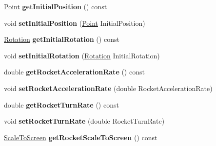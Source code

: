 \begin{DoxyCompactItemize}
\item 
\hyperlink{classPoint}{Point} {\bfseries get\+Initial\+Position} () const \hypertarget{classGameConfiguration_ace6795655ac1a88974356c99810f7e4d}{}\label{classGameConfiguration_ace6795655ac1a88974356c99810f7e4d}

\item 
void {\bfseries set\+Initial\+Position} (\hyperlink{classPoint}{Point} Initial\+Position)\hypertarget{classGameConfiguration_abac5bb94f2284ceb822d08e24c576b0a}{}\label{classGameConfiguration_abac5bb94f2284ceb822d08e24c576b0a}

\item 
\hyperlink{classRotation}{Rotation} {\bfseries get\+Initial\+Rotation} () const \hypertarget{classGameConfiguration_ac57cba6d998f6a3e73d64c445dc322af}{}\label{classGameConfiguration_ac57cba6d998f6a3e73d64c445dc322af}

\item 
void {\bfseries set\+Initial\+Rotation} (\hyperlink{classRotation}{Rotation} Initial\+Rotation)\hypertarget{classGameConfiguration_a84249397382d4d36fc3dd3a03839c10e}{}\label{classGameConfiguration_a84249397382d4d36fc3dd3a03839c10e}

\item 
double {\bfseries get\+Rocket\+Acceleration\+Rate} () const \hypertarget{classGameConfiguration_ae6b5a001a2b8716df1c013193170fe03}{}\label{classGameConfiguration_ae6b5a001a2b8716df1c013193170fe03}

\item 
void {\bfseries set\+Rocket\+Acceleration\+Rate} (double Rocket\+Acceleration\+Rate)\hypertarget{classGameConfiguration_af7dae5f1431544fd6bf5d53bf9434170}{}\label{classGameConfiguration_af7dae5f1431544fd6bf5d53bf9434170}

\item 
double {\bfseries get\+Rocket\+Turn\+Rate} () const \hypertarget{classGameConfiguration_acb6e6e9a9b12c86db6f52d0c06c96622}{}\label{classGameConfiguration_acb6e6e9a9b12c86db6f52d0c06c96622}

\item 
void {\bfseries set\+Rocket\+Turn\+Rate} (double Rocket\+Turn\+Rate)\hypertarget{classGameConfiguration_adc79b8b9c90fc412aebb6e497454623b}{}\label{classGameConfiguration_adc79b8b9c90fc412aebb6e497454623b}

\item 
\hyperlink{classScaleToScreen}{Scale\+To\+Screen} {\bfseries get\+Rocket\+Scale\+To\+Screen} () const \hypertarget{classGameConfiguration_aee4b4d84ef6eddba7578217c94cb5f0c}{}\label{classGameConfiguration_aee4b4d84ef6eddba7578217c94cb5f0c}


\end{DoxyCompactItemize}

